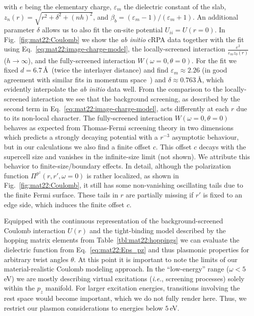 with $e$ being the elementary charge, $\varepsilon_m$ the dielectric constant of the slab, $z_n(r) = \sqrt{r^2 + \delta^2 + (nh)^2}$, and $\beta_b = (\varepsilon_m - 1) / (\varepsilon_m + 1)$. An additional parameter $\delta$ allows us to also fit the on-site potential $U_{ii} = U(r=0)$. In Fig.~\ref{fig:mat22:Coulomb} we show the \textit{ab initio} cRPA data together with the fit using Eq.~\eqref{eq:mat22:image-charge-model}, the locally-screened interaction $\frac{e^2}{\varepsilon_m z_0(r)}$ ($h \rightarrow \infty$), and the fully-screened interaction $W(\omega=0,\theta=0)$. For the fit we fixed $d = 6.7\,$\AA\ (twice the interlayer distance) and find $\varepsilon_m \approx 2.26$ (in good agreement with similar fits in momentum space~\cite{rosner_wannier_2015}) and $\delta \approx 0.763\,$\AA, which evidently interpolate the \textit{ab initio} data well. From the comparison to the locally-screened interaction we see that the background screening, as described by the second term in Eq.~\eqref{eq:mat22:image-charge-model}, acts differently at each $r$ due to its non-local character. The fully-screened interaction $W(\omega=0,\theta=0)$ behaves as expected from Thomas-Fermi screening theory in two dimensions~\cite{katsnelson_nonlinear_2006} which predicts a strongly decaying potential with a $r^{-3}$ asymptotic behaviour, but in our calculations we also find a finite offset $c$. This offset $c$ decays with the supercell size and vanishes in the infinite-size limit (not shown). We attribute this behavior to finite-size/boundary effects. In detail, although the polarization function $\Pi^{p^z}(r, r', \omega=0)$ is rather localized, as shown in Fig.~\ref{fig:mat22:Coulomb}, it still has some non-vanishing oscillating tails due to the finite Fermi surface. These tails in $r$ are partially missing if $r'$ is fixed to an edge side, which induces the finite offset $c$. 

 
Equipped with the continuous representation of the background-screened Coulomb interaction $U(r)$ and the tight-binding model described by the hopping matrix elements from Table~\ref{tbl:mat22:hoppings} we can evaluate the dielectric function from Eq.~\eqref{eq:mat22:Eps_pz} and thus plasmonic properties for arbitrary twist angles $\theta$.  At this point it is important to note the limits of our material-realistic Coulomb modeling approach. In the ``low-energy'' range ($\omega < 5\,$eV) we are mostly describing virtual excitations (\textit{i.e.}, screening processes) solely within the $p_z$ manifold. For larger excitation energies, transitions involving the rest space would become important, which we do not fully render here. Thus, we restrict our plasmon considerations to energies below $5\,$eV.

